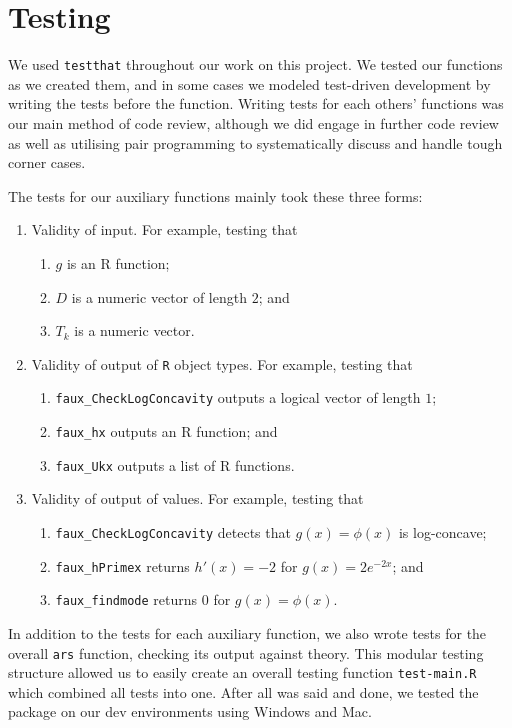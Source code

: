 \documentclass{article}\usepackage[]{graphicx}\usepackage[]{color}
\begin{document}
\section{Testing}

We used \texttt{testthat} throughout our work on this project.
We tested our functions as we created them, and in some cases we modeled
test-driven development by writing the tests before the function.
Writing tests for each others' functions was our main method of code review,
although we did engage in further code review as well as utilising pair programming
to systematically discuss and handle tough corner cases.

The tests for our auxiliary functions mainly took these three forms:
\begin{enumerate}
	\item Validity of input. For example, testing that
	\begin{enumerate}
		\item $g$ is an R function;
		\item $D$ is a numeric vector of length $2$; and
		\item $T_k$ is a numeric vector.
	\end{enumerate}
	\item Validity of output of \texttt{R} object types. For example, testing that
	\begin{enumerate}
		\item \texttt{faux\_CheckLogConcavity} outputs a logical vector of length $1$;
		\item \texttt{faux\_hx} outputs an R function; and
		\item \texttt{faux\_Ukx} outputs a list of R functions.
	\end{enumerate}
	\item Validity of output of values. For example, testing that
	\begin{enumerate}
		\item \texttt{faux\_CheckLogConcavity} detects that $g(x) = \phi(x)$
		is log-concave;
		\item \texttt{faux\_hPrimex} returns $h'(x) = - 2$ for $g(x) = 2e^{-2x}$; and
		\item \texttt{faux\_findmode} returns $0$ for $g(x) = \phi(x)$.
	\end{enumerate}
\end{enumerate}
In addition to the tests for each auxiliary function, we also wrote tests
for the overall \texttt{ars} function, checking its output against theory.
This modular testing structure allowed us to easily create an overall testing
function \texttt{test-main.R} which combined all tests into one.
After all was said and done, we tested the package on our dev environments using Windows
and Mac. 
\end{document}
